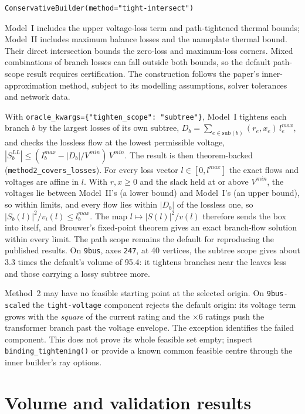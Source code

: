 \documentclass[11pt,a4paper]{report}
\newcommand{\trap}[1]{\begin{warnbox}#1\end{warnbox}}
\newcommand{\code}[1]{\texttt{\small #1}}
\begin{document}
\begin{lstlisting}
ConservativeBuilder(method="tight-intersect")
\end{lstlisting}

Model~I includes the upper voltage-loss term and path-tightened thermal bounds;
Model~II includes maximum balance losses and the nameplate thermal bound.
Their direct intersection bounds the zero-loss and maximum-loss corners.
Mixed combinations of branch losses can fall outside both bounds, so the
default path-scope result requires certification. The construction follows the
paper's inner-approximation method, subject to its modelling assumptions,
solver tolerances and network data.

With \code{oracle\_kwargs=\{"tighten\_scope": "subtree"\}}, Model~I tightens
each branch $b$ by the largest losses of its own subtree,
$D_b = \sum_{e \in \mathrm{sub}(b)} (r_e, x_e)\, l^{max}_e$, and checks the
lossless flow at the lowest permissible voltage,
$|S^{LL}_b| \le (I^{max}_b - |D_b|/V^{min})\, V^{min}$. The result is then
theorem-backed (\code{method2\_covers\_losses}). For every loss vector
$l \in [0, l^{max}]$ the exact flows and voltages are affine in $l$. With
$r, x \ge 0$ and the slack held at or above $V^{min}$, the voltages lie between Model~II's (a lower bound) and Model~I's
(an upper bound), so within limits, and every flow lies within $|D_b|$ of the
lossless one, so $|S_b(l)|^2 / v_i(l) \le l^{max}_b$. The map
$l \mapsto |S(l)|^2 / v(l)$ therefore sends the box into itself, and Brouwer's
fixed-point theorem gives an exact branch-flow solution within every limit.
The path scope remains the default for reproducing the published results. On
\code{9bus}, axes \code{247}, at 40 vertices, the subtree scope gives about 3.3
times the default's volume of 95.4: it tightens branches near the leaves less
and those carrying a lossy subtree more.

\trap{Method~2 may have no feasible starting point at the selected origin. On \code{9bus-scaled} the
\code{tight-voltage} component rejects the default origin: its voltage term
grows with the \emph{square} of the current rating and the $\times 6$ ratings
push the transformer branch past the voltage envelope.
The exception identifies the failed component. This does not prove its whole
feasible set empty; inspect \code{binding\_tightening()} or provide a known
common feasible centre through the inner builder's ray options.}

\section{Volume and validation results}
\end{document}
